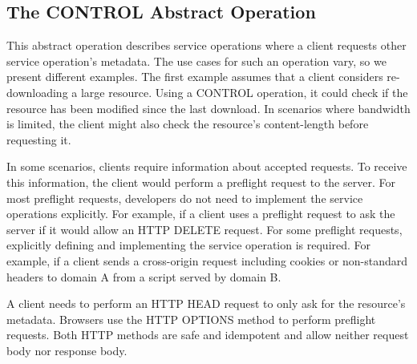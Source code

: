 \subsection{The CONTROL Abstract Operation}

This abstract operation describes service operations where a client requests other service operation's metadata. The use cases for such an operation vary, so we present different examples.
The first example assumes that a client considers re-downloading a large resource. Using a CONTROL operation, it could check if the resource has been modified since the last download. In scenarios where bandwidth is limited, the client might also check the resource's content-length before requesting it.

In some scenarios, clients require information about accepted requests. To receive this information, the client would perform a preflight request to the server. For most preflight requests, developers do not need to implement the service operations explicitly. For example, if a client uses a preflight request to ask the server if it would allow an HTTP DELETE request. For some preflight requests, explicitly defining and implementing the service operation is required. For example, if a client sends a cross-origin request including cookies or non-standard headers to domain A from a script served by domain B. 

A client needs to perform an HTTP HEAD request to only ask for the resource's metadata. Browsers use the HTTP OPTIONS method to perform preflight requests. Both HTTP methods are safe and idempotent and allow neither request body nor response body.  
